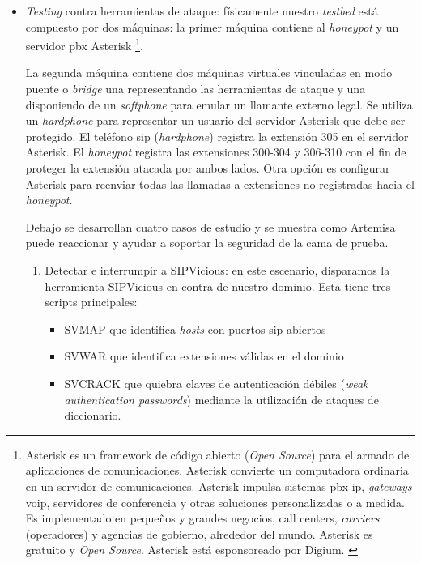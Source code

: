 \documentclass[a4paper,12pt]{report}
\begin{document}
\begin{itemize}
\begin{enumerate}
\end{enumerate}

\item \emph{Testing} contra herramientas de ataque:
físicamente nuestro \emph{testbed} está compuesto por dos máquinas: la primer máquina
contiene al \emph{honeypot} y un servidor \ac{pbx} Asterisk \footnote{Asterisk es un
framework de código abierto (\emph{Open Source}) para el armado de aplicaciones
de comunicaciones. Asterisk convierte un computadora ordinaria en un servidor
de comunicaciones. Asterisk impulsa sistemas \ac{pbx} \ac{ip}, \emph{gateways} \ac{voip}, servidores
de conferencia y otras soluciones personalizadas o a medida. Es implementado en
pequeños y grandes negocios, call centers, \emph{carriers}
(operadores) y agencias de gobierno, alrededor del mundo. Asterisk es gratuito
y \emph{Open Source}. Asterisk está esponsoreado por Digium. \cite{digium}}.

La segunda máquina contiene dos máquinas virtuales vinculadas en modo puente o
\emph{bridge} una representando las herramientas de ataque y una disponiendo de
un \emph{softphone} para e\-mu\-lar un
llamante externo legal. Se utiliza un \emph{hardphone} para representar un usuario
del servidor Asterisk que debe ser protegido. El teléfono \ac{sip}
(\emph{hardphone}) registra la extensión 305 en el servidor Asterisk. El
\emph{honeypot} registra las extensiones 300-304 y 306-310 con el fin de
proteger la extensión atacada por ambos lados. Otra opción es configurar
Asterisk para reenviar todas las llamadas a extensiones no registradas hacia el
\emph{honeypot}.

Debajo se desarrollan cuatro casos de estudio y se muestra como Artemisa
puede reaccionar y ayudar a soportar la seguridad de la cama de prueba. 

\begin{enumerate}

\item Detectar e interrumpir a SIPVicious: 
en este escenario, disparamos la herramienta SIPVicious en contra de nuestro
dominio. Esta tiene tres scripts principales: 
\begin{itemize}
\item{SVMAP que identifica \emph{hosts} con puertos \ac{sip} abiertos}
\item{SVWAR que identifica extensiones válidas en el dominio}
\item{SVCRACK que quiebra claves de autenticación débiles
(\emph{weak authentication passwords}) mediante la utilización de ataques de diccionario.}
\end{itemize}
  

\end{enumerate}
\end{itemize}
\end{document}
